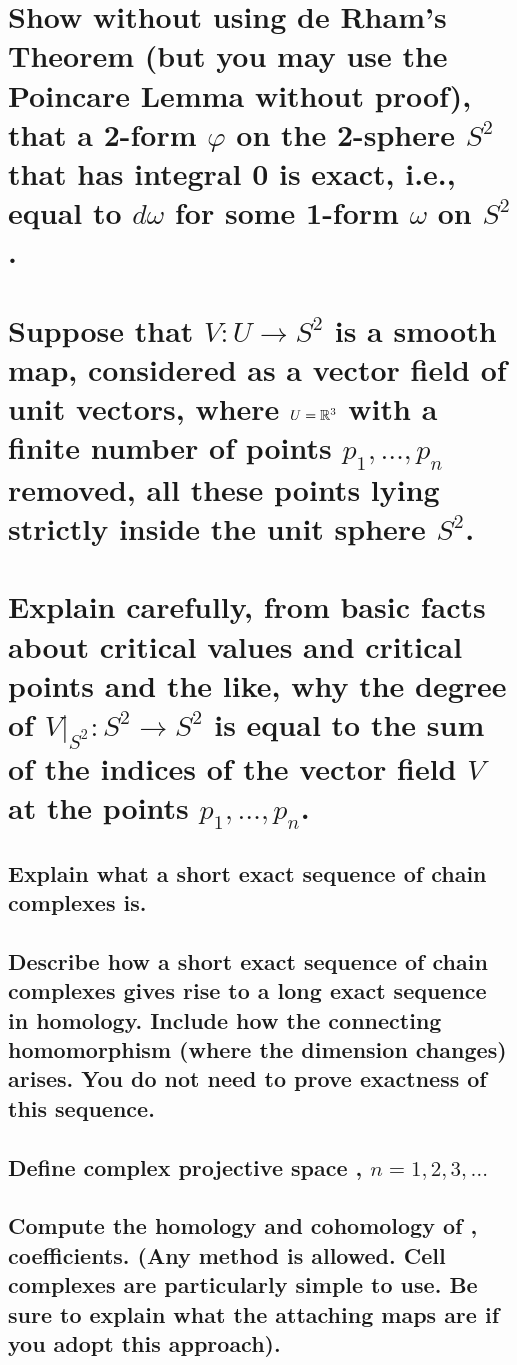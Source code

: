 \documentclass[10pt]{article}
\begin{document}
\section{Show without using de Rham's Theorem (but you may use the Poincare Lemma without proof),
  that a 2-form $\varphi$ on the 2-sphere $S^2$ that has integral 0 is exact, i.e., equal to $d
  \omega$ for some 1-form $\omega$ on $S^2$.}

\section{Suppose that $V: U \to S^2$ is a smooth map, considered as a vector field of unit vectors,
  where $U = \mathbb{R}^3 $ with a finite number of points $p_1, \dots, p_n$ removed, all these
  points lying strictly inside the unit sphere $S^2$. \\\\ Explain carefully, from basic facts about
  critical values and critical points and the like, why the degree of $V|_{S^2} : S^2 \to S^2$ is
  equal to the sum of the indices of the vector field $V$ at the points $p_1, \dots, p_n$.}

\advsection{}

\subsection{Explain what a short exact sequence of chain complexes is.}

\subsection{Describe how a short exact sequence of chain complexes gives rise to a long exact
  sequence in homology. Include how the connecting homomorphism (where the dimension changes)
  arises. You do not need to prove exactness of this sequence.}

\advsection{}

\subsection{Define complex projective space , $n = 1,2,3, \dots$}

\subsection{Compute the homology and cohomology of , \Z coefficients. (Any
  method is allowed. Cell complexes are particularly simple to use. Be sure to explain what the
  attaching maps are if you adopt this approach).}
\end{document}
